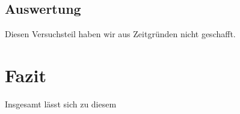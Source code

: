 \documentclass[12pt]{scrartcl}
\begin{document}
\subsection{Auswertung}
Diesen Versuchsteil haben wir aus Zeitgründen nicht geschafft.


\section{Fazit}

Insgesamt lässt sich zu diesem
\end{document}
